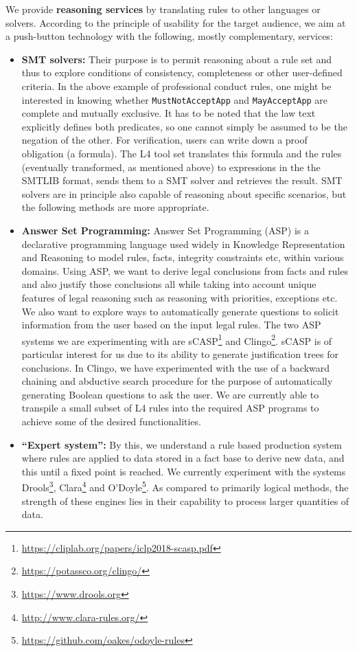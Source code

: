 \documentclass[10pt,a4paper]{article}
\begin{document}
We provide \textbf{reasoning services} by translating rules to other languages or
solvers. According to the principle of usability for the target audience, we
aim at a push-button technology with the following, mostly complementary, services:

\begin{itemize}
\item \textbf{SMT solvers:} Their purpose is to permit reasoning about a rule
  set and thus to explore conditions of consistency, completeness or other
  user-defined criteria. In the above example of professional conduct rules,
  one might be interested in knowing whether
  \texttt{MustNotAcceptApp} and \texttt{MayAcceptApp} are complete and
  mutually exclusive. It has to be noted that the law text explicitly defines
  both predicates, so one cannot simply be assumed to be the negation of the
  other. For verification, users can write down a proof obligation (a formula). The L4
  tool set translates this formula and the rules (eventually transformed, as
  mentioned above) to expressions in the the SMTLIB format, sends them to a
  SMT solver and retrieves the result. 
  SMT solvers are in principle also capable of reasoning about
  specific scenarios, but the following methods are more appropriate.
\item \textbf{Answer Set Programming:} 
Answer Set Programming (ASP) is a declarative programming language used widely in Knowledge Representation and Reasoning to model rules, facts, integrity constraints etc, within various domains. Using ASP, we want to  derive legal conclusions from facts and rules and also justify those conclusions all while taking into account unique features of legal reasoning such as reasoning with priorities, exceptions etc. We also want to explore ways to automatically generate questions to solicit information from the user based on the input legal rules.
The two ASP systems we are experimenting with are sCASP\footnote{\url{https://cliplab.org/papers/iclp2018-scasp.pdf}} and Clingo\footnote{\url{https://potassco.org/clingo/}}. sCASP is of particular interest for us due to its ability to generate justification trees for conclusions. In Clingo, we have experimented with the use of a backward chaining and abductive search procedure for the purpose of automatically generating Boolean questions to ask the user. We are currently able to transpile a small subset of L4 rules into the required ASP programs to achieve some of the desired functionalities.

\item \textbf{``Expert system'':} By this, we understand a rule based
  production system where rules are applied to data stored in a fact base to
  derive new data, and this until a fixed point is reached. We currently
  experiment with the systems Drools\footnote{\url{https://www.drools.org}},
  Clara\footnote{\url{http://www.clara-rules.org/}} and
  O'Doyle\footnote{\url{https://github.com/oakes/odoyle-rules}}. As compared
  to primarily logical methods, the strength
  of these engines lies in their capability to process larger quantities of
  data.
\end{itemize}
\end{document}
